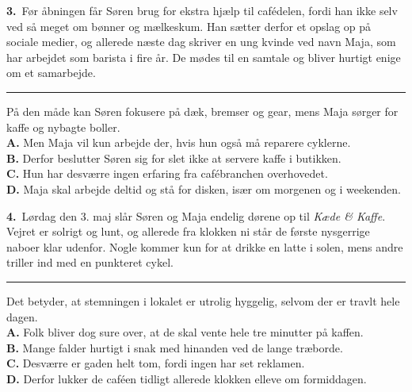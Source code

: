 \begin{tcolorbox}[enhanced, breakable, colback=NCDBgGray, colframe=NCDNavy!60, boxrule=0.7pt, arc=2pt, left=9pt, right=9pt, top=6pt, bottom=6pt]
\textbf{\color{NCDNavy}3.}\ Før åbningen får Søren brug for ekstra hjælp til cafédelen, fordi han ikke selv ved så meget om bønner og mælkeskum. Han sætter derfor et opslag op på sociale medier, og allerede næste dag skriver en ung kvinde ved navn Maja, som har arbejdet som barista i fire år. De mødes til en samtale og bliver hurtigt enige om et samarbejde. \rule{2.3cm}{0.4pt} På den måde kan Søren fokusere på dæk, bremser og gear, mens Maja sørger for kaffe og nybagte boller.\\[4pt]
\textbf{A.} Men Maja vil kun arbejde der, hvis hun også må reparere cyklerne.\\
\textbf{B.} Derfor beslutter Søren sig for slet ikke at servere kaffe i butikken.\\
\textbf{C.} Hun har desværre ingen erfaring fra cafébranchen overhovedet.\\
\textbf{D.} Maja skal arbejde deltid og stå for disken, især om morgenen og i weekenden.
\end{tcolorbox}

\begin{tcolorbox}[enhanced, breakable, colback=NCDBgGray, colframe=NCDNavy!60, boxrule=0.7pt, arc=2pt, left=9pt, right=9pt, top=6pt, bottom=6pt]
\textbf{\color{NCDNavy}4.}\ Lørdag den 3. maj slår Søren og Maja endelig dørene op til \textit{Kæde \& Kaffe}. Vejret er solrigt og lunt, og allerede fra klokken ni står de første nysgerrige naboer klar udenfor. Nogle kommer kun for at drikke en latte i solen, mens andre triller ind med en punkteret cykel. \rule{2.3cm}{0.4pt} Det betyder, at stemningen i lokalet er utrolig hyggelig, selvom der er travlt hele dagen.\\[4pt]
\textbf{A.} Folk bliver dog sure over, at de skal vente hele tre minutter på kaffen.\\
\textbf{B.} Mange falder hurtigt i snak med hinanden ved de lange træborde.\\
\textbf{C.} Desværre er gaden helt tom, fordi ingen har set reklamen.\\
\textbf{D.} Derfor lukker de caféen tidligt allerede klokken elleve om formiddagen.
\end{tcolorbox}

